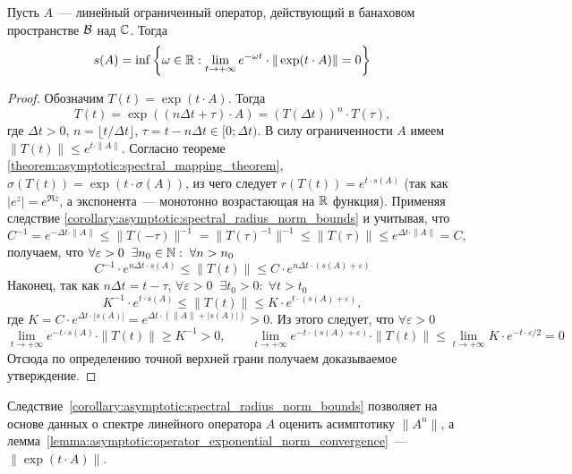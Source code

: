 \begin{lemma}
    \label{lemma:asymptotic:operator_exponential_norm_convergence}
    Пусть $ A $~--- линейный ограниченный оператор, действующий в банаховом пространстве $ \mathcal{B} $ над $ \mathbb{C} $.
    Тогда
    \[
        s(A) = \inf \left \{ \omega \in \mathbb{R}: \lim_{t \to +\infty} e^{-\omega t} \cdot \| \exp(t \cdot A) \| = 0 \right \}
    \]
\end{lemma}

\begin{proof}
    Обозначим $ T(t) = \exp(t \cdot A) $.
    Тогда
    \[
        T(t) = \exp((n \Delta t + \tau) \cdot A) = \left( T(\Delta t) \right)^n \cdot T(\tau),
    \]
    где $ \Delta t > 0 $, $ n = \lfloor t / \Delta t \rfloor $, $ \tau = t - n \Delta t \in [0;\Delta t) $.
    В силу ограниченности $ A $ имеем $ \| T(t) \| \leqslant e^{t \cdot \| A \|} $.
    Согласно теореме \ref{theorem:asymptotic:spectral_mapping_theorem}, $ \sigma(T(t)) = \exp(t \cdot \sigma(A)) $,
    из чего следует $ r(T(t)) = e^{t \cdot s(A)} $
    (так как $ \left| e^z \right| = e^{\Re z} $, а экспонента~--- монотонно возрастающая на $ \mathbb{R} $ функция).
    Применяя следствие \ref{corollary:asymptotic:spectral_radius_norm_bounds} и учитывая, что
    \[
        C^{-1} = e^{-\Delta t \cdot \| A \|} \leqslant \| T(-\tau) \|^{-1} = \| T(\tau)^{-1} \|^{-1} \leqslant \| T(\tau) \| \leqslant e^{\Delta t \cdot \| A \|} = C,
    \]
    получаем, что $ \forall \varepsilon > 0 \;\; \exists n_0 \in \mathbb{N}: \; \forall n > n_0 $
    \[
        C^{-1} \cdot e^{n \Delta t \cdot s(A)} \leqslant \| T(t) \| \leqslant C \cdot e^{n \Delta t \cdot (s(A) + \varepsilon)}
    \]
    Наконец, так как $ n \Delta t = t - \tau $, $ \forall \varepsilon > 0 \;\; \exists t_0 > 0: \; \forall t > t_0 $
    \[
        K^{-1} \cdot e^{t \cdot s(A)} \leqslant \| T(t) \| \leqslant K \cdot e^{t \cdot (s(A) + \varepsilon)},
    \]
    где $ K = C \cdot e^{\Delta t \cdot |s(A)|} = e^{\Delta t \cdot (\|A\| + |s(A)|)} > 0 $. %
    Из этого следует, что $ \forall \varepsilon > 0 $
    \[
        \lim_{t \to +\infty} e^{-t \cdot s(A)} \cdot \| T(t) \| \geqslant K^{-1} > 0,
        \qquad
        \lim_{t \to +\infty} e^{-t \cdot (s(A) + \varepsilon)} \cdot \| T(t) \| \leqslant \lim_{t \to +\infty} K \cdot e^{-t \cdot \varepsilon / 2} = 0
    \]
    Отсюда по определению точной верхней грани получаем доказываемое утверждение.
\end{proof}

Следствие~\ref{corollary:asymptotic:spectral_radius_norm_bounds}
позволяет на основе данных о спектре линейного оператора $ A $ оценить асимптотику $ \| A^n \| $,
а лемма~\ref{lemma:asymptotic:operator_exponential_norm_convergence}~--- $ \| \exp(t \cdot A) \| $.

